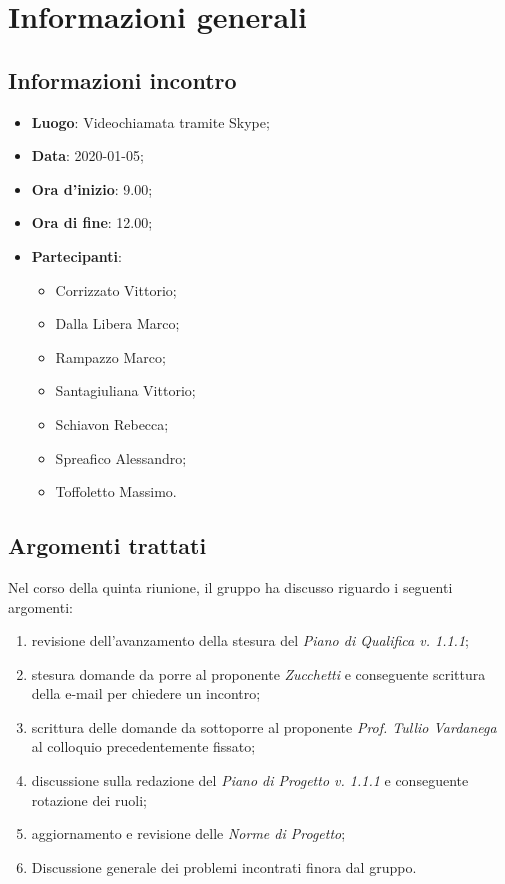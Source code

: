\section{Informazioni generali}
    \subsection{Informazioni incontro}
        \begin{itemize}
            \item \textbf{Luogo}: Videochiamata tramite Skype;
            \item \textbf{Data}: 2020-01-05;
            \item \textbf{Ora d'inizio}: 9.00;
            \item \textbf{Ora di fine}: 12.00;
            \item \textbf{Partecipanti}: \begin{itemize}
                \item Corrizzato Vittorio;
                \item Dalla Libera Marco;
                \item Rampazzo Marco;
                \item Santagiuliana Vittorio;
                \item Schiavon Rebecca;
                \item Spreafico Alessandro;
                \item Toffoletto Massimo.
            \end{itemize}
        \end{itemize}
    \subsection{Argomenti trattati}
        Nel corso della quinta riunione, il gruppo ha discusso riguardo i seguenti argomenti:
        \begin{enumerate}
            \item revisione dell'avanzamento della stesura del \textit{Piano di Qualifica v. 1.1.1}; 
            \item stesura domande da porre al proponente \textit{Zucchetti} e conseguente scrittura della e-mail per chiedere un incontro;
            \item scrittura delle domande da sottoporre al proponente \textit{Prof. Tullio Vardanega} al colloquio precedentemente fissato;
            \item discussione sulla redazione del \textit{Piano di Progetto v. 1.1.1} e conseguente rotazione dei ruoli;
            \item aggiornamento e revisione delle \textit{Norme di Progetto};
            \item Discussione generale dei problemi incontrati finora dal gruppo.
        \end{enumerate}
